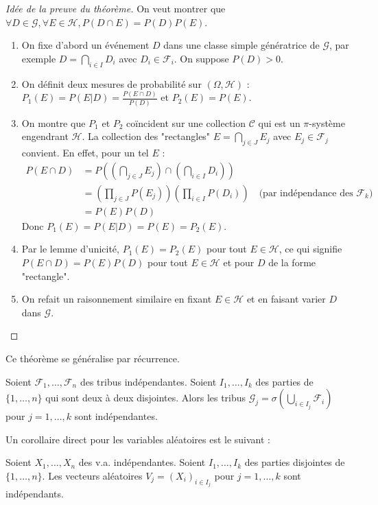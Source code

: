 \begin{proof}[Idée de la preuve du théorème]
On veut montrer que $\forall D \in \mathcal{G}, \forall E \in \mathcal{H}, P(D \cap E) = P(D)P(E)$.
\begin{enumerate}
    \item On fixe d'abord un événement $D$ dans une classe simple génératrice de $\mathcal{G}$, par exemple $D = \bigcap_{i \in I} D_i$ avec $D_i \in \mathcal{F}_i$. On suppose $P(D)>0$.
    \item On définit deux mesures de probabilité sur $(\Omega, \mathcal{H})$ : $P_1(E) = P(E|D) = \frac{P(E \cap D)}{P(D)}$ et $P_2(E) = P(E)$.
    \item On montre que $P_1$ et $P_2$ coïncident sur une collection $\mathcal{C}$ qui est un $\pi$-système engendrant $\mathcal{H}$. La collection des "rectangles" $E = \bigcap_{j \in J} E_j$ avec $E_j \in \mathcal{F}_j$ convient. En effet, pour un tel $E$ :
    \begin{align*}
    P(E \cap D) &= P\left( \left(\bigcap_{j \in J} E_j\right) \cap \left(\bigcap_{i \in I} D_i\right) \right) \\
    &= \left( \prod_{j \in J} P(E_j) \right) \left( \prod_{i \in I} P(D_i) \right) \quad \text{(par indépendance des } \mathcal{F}_k) \\
    &= P(E) P(D)
    \end{align*}
    Donc $P_1(E) = P(E|D) = P(E) = P_2(E)$.
    \item Par le lemme d'unicité, $P_1(E) = P_2(E)$ pour tout $E \in \mathcal{H}$, ce qui signifie $P(E \cap D) = P(E)P(D)$ pour tout $E \in \mathcal{H}$ et pour $D$ de la forme "rectangle".
    \item On refait un raisonnement similaire en fixant $E \in \mathcal{H}$ et en faisant varier $D$ dans $\mathcal{G}$.
\end{enumerate}
\end{proof}
Ce théorème se généralise par récurrence.
\begin{proposition}
Soient $\mathcal{F}_1, \ldots, \mathcal{F}_n$ des tribus indépendantes. Soient $I_1, \ldots, I_k$ des parties de $\{1, \ldots, n\}$ qui sont deux à deux disjointes. Alors les tribus $\mathcal{G}_j = \sigma(\bigcup_{i \in I_j} \mathcal{F}_i)$ pour $j=1, \ldots, k$ sont indépendantes.
\end{proposition}
Un corollaire direct pour les variables aléatoires est le suivant :
\begin{theorem}[Corollaire]
Soient $X_1, \ldots, X_n$ des v.a. indépendantes. Soient $I_1, \ldots, I_k$ des parties disjointes de $\{1, \ldots, n\}$. Les vecteurs aléatoires $V_j = (X_i)_{i \in I_j}$ pour $j=1, \ldots, k$ sont indépendants.
\end{theorem}

